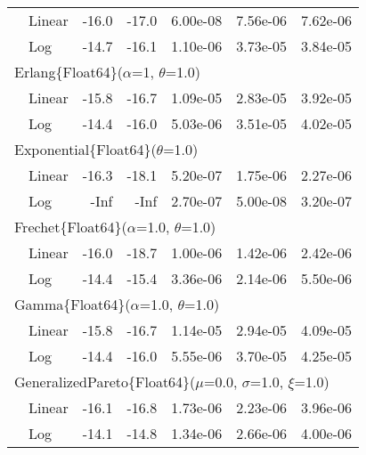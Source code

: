 \begin{tabular}{|llrrrrr|}
& Linear & {\color{blue}-16.0} & {\color{blue}-17.0} & {\color{blue}6.00e-08} & {\color{blue}7.56e-06} & {\color{blue}7.62e-06}\\
& Log & -14.7 & -16.1 & 1.10e-06 & 3.73e-05 & 3.84e-05\\
\hline
\multicolumn{7}{|l|}{Erlang\{Float64\}($\alpha$=1, $\theta$=1.0)}\\ \hline
& Linear & {\color{blue}-15.8} & {\color{blue}-16.7} & 1.09e-05 & {\color{blue}2.83e-05} & {\color{blue}3.92e-05}\\
& Log & -14.4 & -16.0 & {\color{blue}5.03e-06} & 3.51e-05 & 4.02e-05\\
\hline
\multicolumn{7}{|l|}{Exponential\{Float64\}($\theta$=1.0)}\\ \hline
& Linear & -16.3 & -18.1 & 5.20e-07 & 1.75e-06 & 2.27e-06\\
& Log & {\color{blue}-Inf} & {\color{blue}-Inf} & {\color{blue}2.70e-07} & {\color{blue}5.00e-08} & {\color{blue}3.20e-07}\\
\hline
\multicolumn{7}{|l|}{Frechet\{Float64\}($\alpha$=1.0, $\theta$=1.0)}\\ \hline
& Linear & {\color{blue}-16.0} & {\color{blue}-18.7} & {\color{blue}1.00e-06} & {\color{blue}1.42e-06} & {\color{blue}2.42e-06}\\
& Log & -14.4 & -15.4 & 3.36e-06 & 2.14e-06 & 5.50e-06\\
\hline
\multicolumn{7}{|l|}{Gamma\{Float64\}($\alpha$=1.0, $\theta$=1.0)}\\ \hline
& Linear & {\color{blue}-15.8} & {\color{blue}-16.7} & 1.14e-05 & {\color{blue}2.94e-05} & {\color{blue}4.09e-05}\\
& Log & -14.4 & -16.0 & {\color{blue}5.55e-06} & 3.70e-05 & 4.25e-05\\
\hline
\multicolumn{7}{|l|}{GeneralizedPareto\{Float64\}($\mu$=0.0, $\sigma$=1.0, $\xi$=1.0)}\\ \hline
& Linear & {\color{blue}-16.1} & {\color{blue}-16.8} & 1.73e-06 & {\color{blue}2.23e-06} & {\color{blue}3.96e-06}\\
& Log & -14.1 & -14.8 & {\color{blue}1.34e-06} & 2.66e-06 & 4.00e-06\\
\hline
\end{tabular}